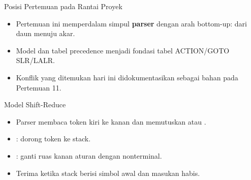 \documentclass[aspectratio=169,10pt,t]{beamer}
\begin{document}
\begin{frame}{Posisi Pertemuan pada Rantai Proyek}

  \vspace{2pt}
  \begin{itemize}
    \item Pertemuan ini memperdalam simpul \textbf{parser} dengan arah
          bottom-up: dari daun menuju akar.
    \item Model  dan tabel precedence menjadi
          fondasi tabel ACTION/GOTO SLR/LALR.
    \item Konflik yang ditemukan hari ini didokumentasikan sebagai
          bahan  pada Pertemuan 11.
  \end{itemize}
\end{frame}

\begin{frame}{Model Shift-Reduce}
  \begin{center}
  \end{center}

  \begin{itemize}
    \item Parser membaca token kiri ke kanan dan memutuskan
           atau .
    \item {}: dorong token ke stack.
    \item {}: ganti ruas kanan aturan dengan nonterminal.
    \item Terima ketika stack berisi simbol awal dan masukan habis.
  \end{itemize}
\end{frame}
\end{document}
